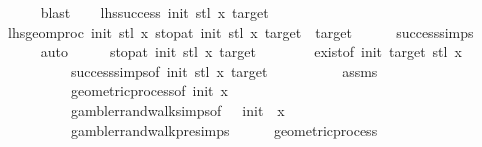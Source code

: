 \begin{isabellebody}
\ \ \ \ \isamarkupfalse%
\ blast\isanewline
\ \ \isamarkupfalse%
\ lhs{\isacharcolon}{\kern0pt}{\isachardoublequoteopen}success\ init{\isacharprime}{\kern0pt}\ {\isacharparenleft}{\kern0pt}stl\ x{\isacharparenright}{\kern0pt}\ target{\isachardoublequoteclose}\isanewline
\ \ \isamarkupfalse%
\ \isamarkupfalse%
\ lhs{}{\isacharcolon}{\kern0pt}{\isachardoublequoteopen}geom{\isacharunderscore}{\kern0pt}proc\ init{\isacharprime}{\kern0pt}\ {\isacharparenleft}{\kern0pt}stl\ x{\isacharparenright}{\kern0pt}\ {\isacharparenleft}{\kern0pt}stop{\isacharunderscore}{\kern0pt}at\ init{\isacharprime}{\kern0pt}\ {\isacharparenleft}{\kern0pt}stl\ x{\isacharparenright}{\kern0pt}\ target{\isacharparenright}{\kern0pt}\ {\isacharequal}{\kern0pt}\ target{\isachardoublequoteclose}\isanewline
\ \ \ \ \isamarkupfalse%
\ success{\isachardot}{\kern0pt}simps\ \isanewline
\ \ \ \ \isamarkupfalse%
\ auto\isanewline
\ \ \isamarkupfalse%
\ \isamarkupfalse%
\ {\isachardoublequoteopen}stop{\isacharunderscore}{\kern0pt}at\ init{\isacharprime}{\kern0pt}\ {\isacharparenleft}{\kern0pt}stl\ x{\isacharparenright}{\kern0pt}\ target\ {\isasymnoteq}\ {\isasyminfinity}{\isachardoublequoteclose}\isanewline
\ \ \ \ \isamarkupfalse%
\ exist{\isacharbrackleft}{\kern0pt}of\ init{\isacharprime}{\kern0pt}\ target\ {\isachardoublequoteopen}stl\ x{\isachardoublequoteclose}{\isacharbrackright}{\kern0pt}\ \isanewline
\ \ \ \ \ \ \ \ \ \ success{\isachardot}{\kern0pt}simps{\isacharbrackleft}{\kern0pt}of\ init{\isacharprime}{\kern0pt}\ {\isachardoublequoteopen}stl\ x{\isachardoublequoteclose}\ target{\isacharbrackright}{\kern0pt}\isanewline
\ \ \ \ \ \ \ \ \ \ assms\isanewline
\ \ \ \ \ \ \ \ \ \ geometric{\isacharunderscore}{\kern0pt}process{\isacharbrackleft}{\kern0pt}of\ init\ x\ {}{\isacharbrackright}{\kern0pt}\isanewline
\ \ \ \ \ \ \ \ \ \ gambler{\isacharunderscore}{\kern0pt}rand{\isacharunderscore}{\kern0pt}walk{\isachardot}{\kern0pt}simps{\isacharbrackleft}{\kern0pt}of\ {}\ {\isachardoublequoteopen}{\isacharminus}{\kern0pt}{}{\isachardoublequoteclose}\ init\ {}\ x{\isacharbrackright}{\kern0pt}\isanewline
\ \ \ \ \ \ \ \ \ \ gambler{\isacharunderscore}{\kern0pt}rand{\isacharunderscore}{\kern0pt}walk{\isacharunderscore}{\kern0pt}pre{\isachardot}{\kern0pt}simps\isanewline
\ \ \ \ \isamarkupfalse%
\ geometric{\isacharunderscore}{\kern0pt}process\ \isamarkupfalse%

\end{isabellebody}
